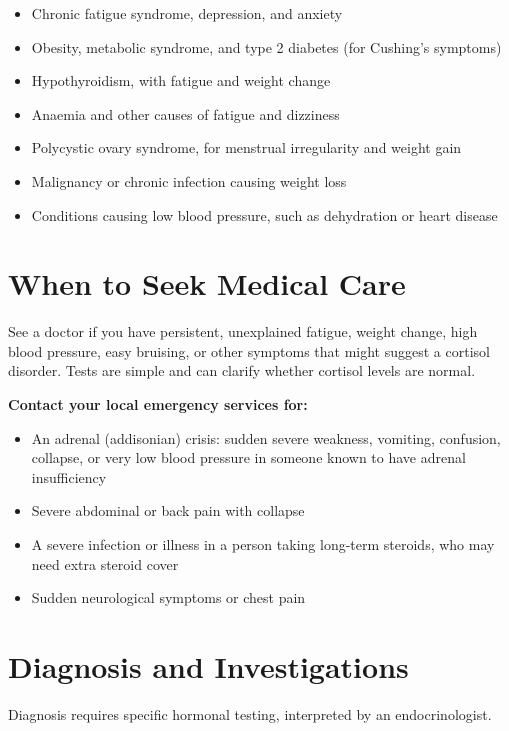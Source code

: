\begin{itemize}
    \item Chronic fatigue syndrome, depression, and anxiety
    \item Obesity, metabolic syndrome, and type 2 diabetes (for Cushing's symptoms)
    \item Hypothyroidism, with fatigue and weight change
    \item Anaemia and other causes of fatigue and dizziness
    \item Polycystic ovary syndrome, for menstrual irregularity and weight gain
    \item Malignancy or chronic infection causing weight loss
    \item Conditions causing low blood pressure, such as dehydration or heart disease
\end{itemize}

\section*{When to Seek Medical Care}
See a doctor if you have persistent, unexplained fatigue, weight change, high blood pressure, easy bruising, or other symptoms that might suggest a cortisol disorder. Tests are simple and can clarify whether cortisol levels are normal.

\textbf{Contact your local emergency services for:}
\begin{itemize}
    \item An adrenal (addisonian) crisis: sudden severe weakness, vomiting, confusion, collapse, or very low blood pressure in someone known to have adrenal insufficiency
    \item Severe abdominal or back pain with collapse
    \item A severe infection or illness in a person taking long-term steroids, who may need extra steroid cover
    \item Sudden neurological symptoms or chest pain
\end{itemize}

\section*{Diagnosis and Investigations}
Diagnosis requires specific hormonal testing, interpreted by an endocrinologist.

